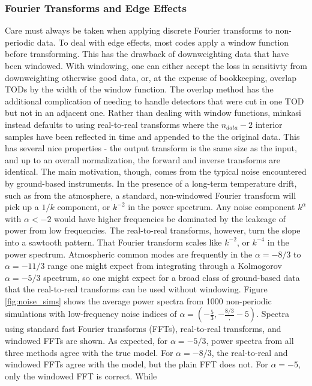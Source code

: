 \documentclass[12]{article}
\begin{document}
\subsubsection{Fourier Transforms and Edge Effects}

Care must always be taken when applying discrete Fourier transforms to
non-periodic data.  To deal with edge effects, most codes apply a
window function before transforming.  This has the drawback of
downweighting data that have been windowed.  With windowing, one can
either accept the loss in sensitivty from downweighting otherwise good
data, or, at the expense of bookkeeping, overlap TODs by the width of
the window function.  The overlap method has the additional
complication of needing to handle detectors that were cut in one TOD
but not in an adjacent one.  Rather than dealing with window
functions, minkasi instead defaults to using real-to-real transforms
where the $n_{data}-2$ interior samples have been reflected in time
and appended to the the original data.  This has several nice
properties - the output transform is the same size as the input, and
up to an overall normalization, the forward and inverse transforms are
identical.  The main motivation, though, comes from the typical noise
encountered by ground-based instruments.  In the presence of a
long-term temperature drift, such as from the atmosphere, a standard,
non-windowed Fourier transform will pick up a $1/k$ component, or
$k^{-2}$ in the power spectrum.  Any noise component $k^{\alpha}$ with
$\alpha<-2$ would have higher frequencies be dominated by the leakeage
of power from low frequencies.  The real-to-real transforms, however,
turn the slope into a sawtooth pattern.  That Fourier transform scales
like $k^{-2}$, or $k^{-4}$ in the power spectrum. Atmospheric common
modes are frequently in the $\alpha={-8/3}$ to $\alpha=-11/3$ range one might expect
from integrating through a Kolmogorov$\alpha={-5/3}$ spectrum, so
one might expect for a broad class of ground-based data that the
real-to-real transforms can be used without windowing.  Figure
\ref{fig:noise_sims} shows the average power spectra from 1000
non-periodic simulations with low-frequency noise indices of
$\alpha=(-\frac{5}{3}, -\frac{8/3}, -5)$.  Spectra using standard fast
Fourier transforms (FFTs), real-to-real transforms, and windowed FFTs
are shown.  As expected, for $\alpha=-5/3$, power spectra from all
three methods agree with the true model.  For $\alpha=-8/3$, the
real-to-real and windowed FFTs agree with the model, but the plain FFT
does not.  For $\alpha=-5$, only the windowed FFT is correct.  While
\end{document}
